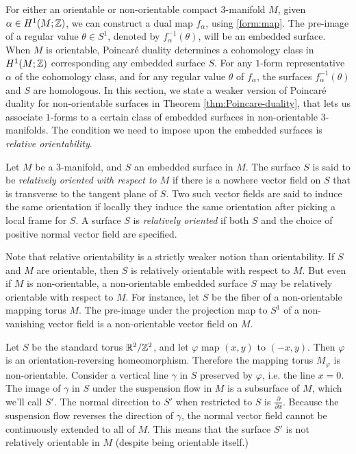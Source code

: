 For either an orientable or non-orientable compact 3-manifold $M$, given $\alpha\in H^1(M; \mathbb{Z})$, we can construct a dual map $f_\alpha$, using \eqref{form:map}.
The pre-image of a regular value $\theta \in S^1$, denoted by $f_{\alpha}^{-1}(\theta)$, will be an embedded surface.
When $M$ is orientable, Poincar\'e duality determines a cohomology class in $H^1(M; \mathbb{Z})$ corresponding any embedded surface $S$.
For any $1$-form representative $\alpha$ of the cohomology class, and for any regular value $\theta$ of $f_{\alpha}$, the surfaces $f_{\alpha}^{-1}(\theta)$ and $S$ are homologous.
In this section, we state a weaker version of Poincar\'e duality for non-orientable surfaces in Theorem \ref{thm:Poincare-duality}, that lets us associate $1$-forms to a certain class of embedded surfaces in non-orientable $3$-manifolds.
The condition we need to impose upon the embedded surfaces is \emph{relative orientability}.

\begin{defn}
  Let $M$ be a $3$-manifold, and $S$ an embedded surface in $M$.
  The surface $S$ is said to be \emph{relatively oriented with respect to $M$} if there is a nowhere vector field on $S$ that is transverse to the tangent plane of $S$.
  Two such vector fields are said to induce the same orientation if locally they induce the same orientation after picking a local frame for $S$.
  A surface $S$ is \emph{relatively oriented} if both $S$ and the choice of positive normal vector field are specified.
\end{defn}
Note that relative orientability is a strictly weaker notion than orientability.
If $S$ and $M$ are orientable, then $S$ is relatively orientable with respect to $M$.
But even if $M$ is non-orientable, a non-orientable embedded surface $S$ may be relatively orientable with respect to $M$.
For instance, let $S$ be the fiber of a non-orientable mapping torus $M$.
The pre-image under the projection map to $S^1$ of a non-vanishing vector field is a non-orientable vector field on $M$.

\begin{example}
  Let $S$ be the standard torus $\mathbb{R}^2/\mathbb{Z}^2$, and let $\varphi$ map $(x,y)$ to $(-x, y)$.
  Then $\varphi$ is an orientation-reversing homeomorphism.
  Therefore the mapping torus $M_\varphi$ is non-orientable.
  Consider a vertical line $\gamma$ in $S$ preserved by $\varphi$, i.e. the line
  $x = 0$.
  The image of $\gamma$ in $S$ under the suspension flow in $M$ is a subsurface of $M$, which we'll call $S'$.
  The normal direction to $S'$ when restricted to $S$ is $\frac{\partial}{\partial x}$.
  Because the suspension flow reverses the direction of $\gamma$, the normal vector field cannot be continuously extended to all of $M$.
  This means that the surface $S'$ is not relatively orientable in $M$ (despite being orientable itself.)
\end{example}

